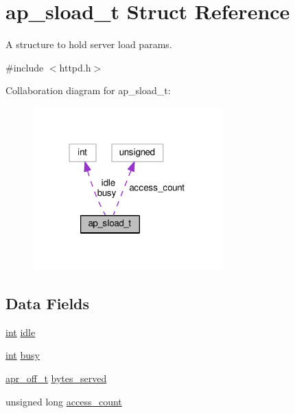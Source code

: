\hypertarget{structap__sload__t}{}\section{ap\+\_\+sload\+\_\+t Struct Reference}
\label{structap__sload__t}


A structure to hold server load params.  




{\ttfamily \#include $<$httpd.\+h$>$}



Collaboration diagram for ap\+\_\+sload\+\_\+t\+:
\nopagebreak
\begin{figure}[H]
\begin{center}
\leavevmode
\includegraphics[width=207pt]{structap__sload__t__coll__graph}
\end{center}
\end{figure}
\subsection*{Data Fields}
\begin{DoxyCompactItemize}
\item 
\hyperlink{pcre_8txt_a42dfa4ff673c82d8efe7144098fbc198}{int} \hyperlink{structap__sload__t_a8d5bd61e31760519a3c79e57e509711b}{idle}
\item 
\hyperlink{pcre_8txt_a42dfa4ff673c82d8efe7144098fbc198}{int} \hyperlink{structap__sload__t_abafc49c09a4aa861150eec148017c554}{busy}
\item 
\hyperlink{group__apr__platform_ga6938af9075cec15c88299109381aa984}{apr\+\_\+off\+\_\+t} \hyperlink{structap__sload__t_a1e7db52118b8ac164a98e6894ea36b0b}{bytes\+\_\+served}
\item 
unsigned long \hyperlink{structap__sload__t_a2dd1914b61a43168e24498722e54b105}{access\+\_\+count}
\end{DoxyCompactItemize}


